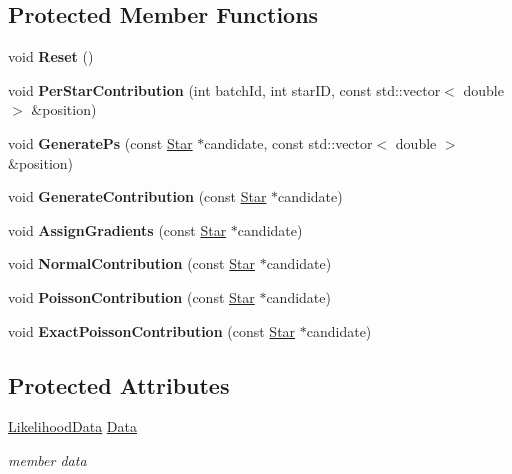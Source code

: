 \subsection*{Protected Member Functions}
\begin{DoxyCompactItemize}
\item 
\mbox{\label{classLogLikelihood_a323459623fea6256267c9724ceea8ec9}} 
void {\bfseries Reset} ()
\item 
\mbox{\label{classLogLikelihood_a85c0af6993edd46373165089a11b4fb7}} 
void {\bfseries Per\+Star\+Contribution} (int batch\+Id, int star\+ID, const std\+::vector$<$ double $>$ \&position)
\item 
\mbox{\label{classLogLikelihood_aec7a3964705a6a48a1d18011e330d585}} 
void {\bfseries Generate\+Ps} (const \hyperlink{classStar}{Star} $\ast$candidate, const std\+::vector$<$ double $>$ \&position)
\item 
\mbox{\label{classLogLikelihood_ae0db177a301dbcb1ceb13575585dc2b2}} 
void {\bfseries Generate\+Contribution} (const \hyperlink{classStar}{Star} $\ast$candidate)
\item 
\mbox{\label{classLogLikelihood_a525d4693f7231cb70405af68d2c2c6e9}} 
void {\bfseries Assign\+Gradients} (const \hyperlink{classStar}{Star} $\ast$candidate)
\item 
\mbox{\label{classLogLikelihood_a45c146d322f6a78b760383b624df66c8}} 
void {\bfseries Normal\+Contribution} (const \hyperlink{classStar}{Star} $\ast$candidate)
\item 
\mbox{\label{classLogLikelihood_a48e99798d1bad7dc63fdf2019acc1c7b}} 
void {\bfseries Poisson\+Contribution} (const \hyperlink{classStar}{Star} $\ast$candidate)
\item 
\mbox{\label{classLogLikelihood_ac848d93699c16868bf4da1884fe5c45a}} 
void {\bfseries Exact\+Poisson\+Contribution} (const \hyperlink{classStar}{Star} $\ast$candidate)
\end{DoxyCompactItemize}
\subsection*{Protected Attributes}
\begin{DoxyCompactItemize}
\item 
\mbox{\label{classLogLikelihood_ae89760ae57fa9e0ce5ef01c2b35cf487}} 
\hyperlink{classLikelihoodData}{Likelihood\+Data} \hyperlink{classLogLikelihood_ae89760ae57fa9e0ce5ef01c2b35cf487}{Data}
\begin{DoxyCompactList}\small\item\em member data \end{DoxyCompactList}\end{DoxyCompactItemize}


